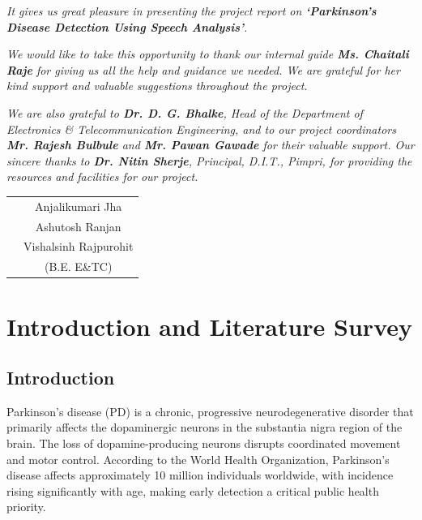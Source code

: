 \documentclass[oneside,a4paper,12pt]{report}
\begin{document}
\textit{It gives us great pleasure in presenting the project report on
\textbf{`Parkinson's Disease Detection Using Speech Analysis'}.}
\vspace*{1\baselineskip}

\textit{We would like to take this opportunity to thank our internal guide
\textbf{Ms. Chaitali Raje} for giving us all the help and guidance we needed.
We are grateful for her kind support and valuable suggestions throughout the
project.}
\vspace*{1\baselineskip}

\textit{We are also grateful to \textbf{Dr. D. G. Bhalke}, Head of the Department
of Electronics \& Telecommunication Engineering, and to our project coordinators
\textbf{Mr. Rajesh Bulbule} and \textbf{Mr. Pawan Gawade} for their valuable
support. Our sincere thanks to \textbf{Dr. Nitin Sherje}, Principal, D.I.T.,
Pimpri, for providing the resources and facilities for our project.}
\vspace*{2\baselineskip} \\
\begin{tabular}{p{8.2cm}c}
&Anjalikumari Jha\\
&Ashutosh Ranjan\\
&Vishalsinh Rajpurohit\\
&(B.E. E\&TC)
\end{tabular}
\setlength{\parindent}{0mm}

\tableofcontents
\listoffigures
\listoftables

\clearpage
{}
\setlength{\parindent}{11mm}

\chapter{Introduction and Literature Survey}

\section{Introduction}
Parkinson's disease (PD) is a chronic, progressive neurodegenerative disorder
that primarily affects the dopaminergic neurons in the substantia nigra region
of the brain. The loss of dopamine-producing neurons disrupts coordinated
movement and motor control. According to the World Health Organization,
Parkinson's disease affects approximately 10 million individuals worldwide, with
incidence rising significantly with age, making early detection a critical public
health priority.
\end{document}
